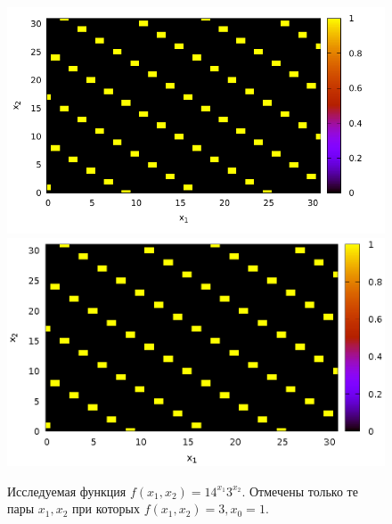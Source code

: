 \begin{figure}
\centering
\ifpdf
\includegraphics[angle=0]
{./part4/quantcomp/picdiscretlog1.pdf}
\else
\includegraphics[angle=0]
{./part4/quantcomp/picdiscretlog1.eps}
\fi

%

\caption{Исследуемая функция $f(x_1, x_2) = 14^{x_1}3^{x_2}$. Отмечены
только те пары $x_1, x_2$ при которых $f(x_1, x_2) = 3, x_0 = 1$.} 
\label{fig:part4:quantcomp:dl1}
\end{figure}
